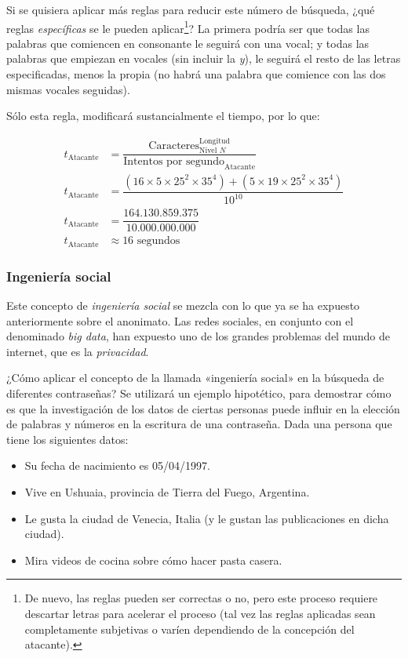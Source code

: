 \documentclass[12pt,a4paper,twoside]{book}
\begin{document}
Si se quisiera aplicar más reglas para reducir este número de búsqueda, ¿qué reglas \textit{específicas} se le pueden aplicar\footnote{De nuevo, las reglas pueden ser correctas o no, pero este proceso requiere descartar letras para acelerar el proceso (tal vez las reglas aplicadas sean completamente subjetivas o varíen dependiendo de la concepción del atacante).}? La primera podría ser que todas las palabras que comiencen en consonante le seguirá con una vocal; y todas las palabras que empiezan en vocales (sin incluir la \textit{y}), le seguirá el resto de las letras especificadas, menos la propia (no habrá una palabra que comience con las dos mismas vocales seguidas).

Sólo esta regla, modificará sustancialmente el tiempo, por lo que:

\begin{align*}
t_{\text{Atacante}} &= \dfrac{\text{Caracteres}^{\text{Longitud}}_{\text{Nivel } N}}{\text{Intentos por segundo}_\text{Atacante}} \\
t_{\text{Atacante}} &= \dfrac{(16 \times 5 \times 25^{2} \times 35^{4}) + (5 \times 19 \times 25^{2} \times 35^{4})}{10^{10}} \\
t_{\text{Atacante}} &= \dfrac{164.130.859.375}{10.000.000.000} \\
t_{\text{Atacante}} &\approx 16 \text{ segundos}
\end{align*}

\subsubsection{Ingeniería social}
Este concepto de \textit{ingeniería social} se mezcla con lo que ya se ha expuesto anteriormente sobre el anonimato. Las redes sociales, en conjunto con el denominado \textit{big data}, han expuesto uno de los grandes problemas del mundo de internet, que es la \textit{privacidad}.

¿Cómo aplicar el concepto de la llamada «ingeniería social» en la búsqueda de diferentes contraseñas? Se utilizará un ejemplo hipotético, para demostrar cómo es que la investigación de los datos de ciertas personas puede influir en la elección de palabras y números en la escritura de una contraseña. Dada una persona que tiene los siguientes datos:

\begin{itemize}
\item Su fecha de nacimiento es 05/04/1997.
\item Vive en Ushuaia, provincia de Tierra del Fuego, Argentina.
\item Le gusta la ciudad de Venecia, Italia (y le gustan las publicaciones en dicha ciudad).
\item Mira videos de cocina sobre cómo hacer pasta casera.
\end{itemize}
\end{document}
